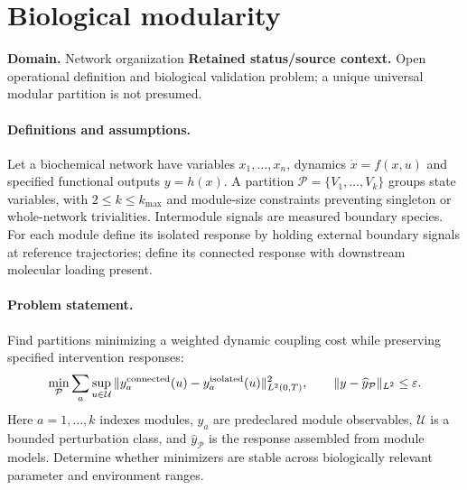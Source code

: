 \documentclass[11pt]{article}
\begin{document}
\section*{Biological modularity}
\label{prob:053}
\label{rank:219}
\par\smallskip

\noindent\textbf{Domain.} Network organization \quad \textbf{Retained status/source context.} Open operational definition and biological validation problem; a unique universal modular partition is not presumed.
\paragraph{Definitions and assumptions.} Let a biochemical network have variables $x_1,\ldots,x_n$, dynamics $\dot x=f(x,u)$ and specified functional outputs $y=h(x)$. A partition $\mathcal P=\{V_1,\ldots,V_k\}$ groups state variables, with $2\le k\le k_{\max}$ and module-size constraints preventing singleton or whole-network trivialities. Intermodule signals are measured boundary species. For each module define its isolated response by holding external boundary signals at reference trajectories; define its connected response with downstream molecular loading present.
\paragraph{Problem statement.} Find partitions minimizing a weighted dynamic coupling cost while preserving specified intervention responses:
\[\min_{\mathcal P}\sum_a\sup_{u\in\mathcal U}\|y_a^{\rm connected}(u)-y_a^{\rm isolated}(u)\|_{L^2(0,T)}^2,\qquad \|y-\widehat y_{\mathcal P}\|_{L^2}\le\varepsilon.\]
Here $a=1,\ldots,k$ indexes modules, $y_a$ are predeclared module observables, $\mathcal U$ is a bounded perturbation class, and $\widehat y_{\mathcal P}$ is the response assembled from module models. Determine whether minimizers are stable across biologically relevant parameter and environment ranges.
\end{document}
